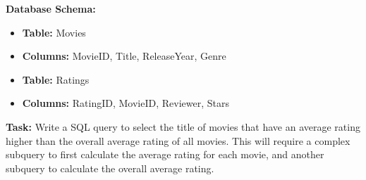 \noindent \textbf{Database Schema:}
\begin{itemize}
    \item \textbf{Table:} Movies
    \item \textbf{Columns:} MovieID, Title, ReleaseYear, Genre
    \item \textbf{Table:} Ratings
    \item \textbf{Columns:} RatingID, MovieID, Reviewer, Stars
\end{itemize}

\noindent \textbf{Task:} Write a SQL query to select the title of movies that have an average rating higher than the overall average rating of all movies. This will require a complex subquery to first calculate the average rating for each movie, and another subquery to calculate the overall average rating.\\

